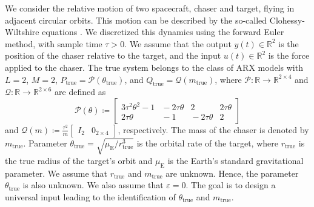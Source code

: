 \documentclass[journal,twoside,web]{ieeecolor}
\begin{document}
We consider the relative motion of two spacecraft, chaser and target, flying in adjacent circular orbits. This motion can be described by the so-called Clohessy-Wiltshire equations \cite[Sec. II]{sullivan2017comprehensive}. We discretized this dynamics using the forward Euler method, with sample time $\tau>0$. We assume that the output $y(t)\in\mathbb{R}^{2}$ is the position of the chaser relative to the target, and the input $u(t)\in\mathbb{R}^2$ is the force applied to the chaser. The true system belongs to the class of ARX models with $L=2$, $M=2$, $P_\text{true}=\mathcal{P}(\theta_\text{true})$, and $Q_\text{true}=\mathcal{Q}(m_\text{true})$,
where $\mathcal{P}:\mathbb{R}\rightarrow\mathbb{R}^{2\times 4}$ and $\mathcal{Q}:\mathbb{R}\rightarrow\mathbb{R}^{2\times 6}$ are defined as
\begin{equation}
\mathcal{P}(\theta)\!\coloneqq\!\begin{bmatrix}
3\tau^2\theta^2\!-\!1 \!\!&\!\! -2\tau\theta \!\!&\!\! 2 \!\!&\!\! 2\tau\theta \\
2\tau\theta \!\!&\!\! -1 \!\!&\!\! -2\tau\theta \!\!&\!\! 2
\end{bmatrix}
\end{equation}
and $\mathcal{Q}(m)\!\coloneqq\!\frac{\tau^2}{m}\begin{bmatrix}
I_2 & 0_{2\times 4}
\end{bmatrix}$, respectively. The mass of the chaser is denoted by \mbox{$m_\text{true}$}. Parameter \mbox{$\theta_\text{true}=\sqrt{\mu_\text{E}/r_\text{true}^3}$} is the orbital rate of the target, where $r_\text{true}$ is the true radius of the target's orbit and $\mu_\text{E}$ is the Earth's standard gravitational parameter. We assume that $r_\text{true}$ and $m_\text{true}$ are unknown. Hence, the parameter \mbox{$\theta_\text{true}$} is also unknown. We also assume that $\varepsilon=0$. The goal is to design a universal input leading to the identification of $\theta_\text{true}$ and $m_\text{true}$.
\end{document}
